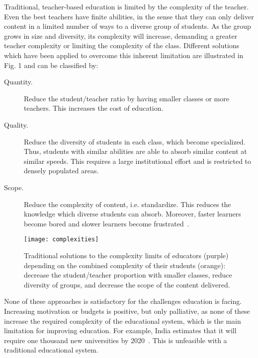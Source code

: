 \documentclass[12pt]{article}
\begin{document}
Traditional, teacher-based education is limited by the complexity of the teacher. Even the best teachers have finite abilities, in the sense that they can only deliver content in a limited number of ways to a diverse group of students. As the group grows in size and diversity, its complexity will increase, demanding a greater teacher complexity or limiting the complexity of the class. Different solutions which have been applied to overcome this inherent limitation are illustrated in Fig. 1 and can be classified by:

\begin{description}
\item [Quantity.] Reduce the student/teacher ratio by having smaller classes or more teachers. This increases the cost of education.
\item [Quality.] Reduce the diversity of students in each class, which become specialized. Thus, students with similar abilities are able to absorb similar content at similar speeds. This requires a large institutional effort and is restricted to densely populated areas.
\item [Scope.] Reduce the complexity of content, i.e. standardize. This reduces the knowledge which diverse students can absorb. Moreover, faster learners become bored and slower learners become frustrated~\cite{Csikszentmihalyi1990Flow}.
\end{description}


\begin{figure}[htbp]
\begin{center}
  \texttt{[image: complexities]}\\
\caption{Traditional solutions to the complexity limits of educators (purple) depending on the combined complexity of their students (orange): decrease the student/teacher proportion with smaller classes, reduce diversity of groups, and decrease the scope of the content delivered.}
\label{fig:cx}
\end{center}
\end{figure}


None of these approaches is satisfactory for the challenges education is facing. Increasing motivation or budgets is positive, but only palliative, as none of these increase the required complexity of the educational system, which is the main limitation for improving education.
For example, India estimates that it will require one thousand new universities by 2020~\cite{Davidson20101000-new-univer}. This is unfeasible with a traditional educational system.
\end{document}
